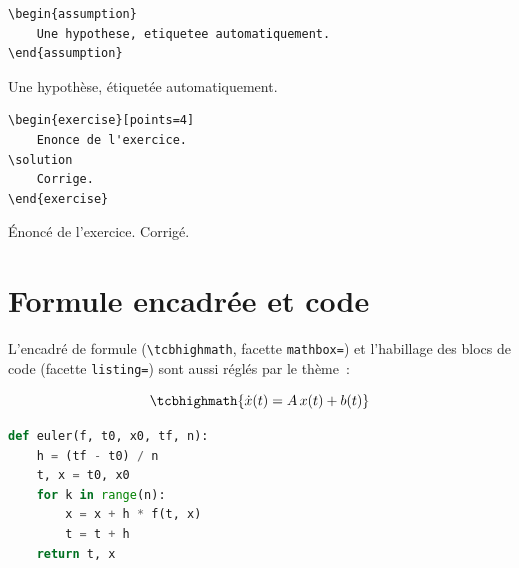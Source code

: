 \begin{lstlisting}
\begin{assumption}
    Une hypothese, etiquetee automatiquement.
\end{assumption}
\end{lstlisting}
\begin{assumption}
    Une hypothèse, étiquetée automatiquement.
\end{assumption}

\begin{lstlisting}
\begin{exercise}[points=4]
    Enonce de l'exercice.
\solution
    Corrige.
\end{exercise}
\end{lstlisting}
\begin{exercise}[points=4]
    Énoncé de l'exercice.
\solution
    Corrigé.
\end{exercise}

\section{Formule encadrée et code}

L'encadré de formule (\lstinline|\tcbhighmath|, facette \texttt{mathbox=}) et
l'habillage des blocs de code (facette \texttt{listing=}) sont aussi réglés par
le thème~:

\[
    \tcbhighmath{\dot{x}(t) = A\, x(t) + b(t)}
\]

\begin{lstlisting}[language=Python, caption={Une méthode d'Euler explicite}]
def euler(f, t0, x0, tf, n):
    h = (tf - t0) / n
    t, x = t0, x0
    for k in range(n):
        x = x + h * f(t, x)
        t = t + h
    return t, x
\end{lstlisting}
